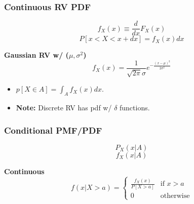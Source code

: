 \subsubsection{Continuous RV PDF}
\begin{definition}
    \begin{equation}
        f_X(x) \equiv \frac{d}{dx} F_X(x)
    \end{equation}
    \begin{equation}
        P[x < X < x+dx] = f_X (x) dx
    \end{equation}
\end{definition}

\begin{example} \textbf{Gaussian RV w/ ($\mu,\sigma^2$)}
    \begin{equation}
        f_X (x) = \frac{1}{\sqrt{2\pi}\sigma} e^{-\frac{(x-\mu)^2}{2\sigma^2}}
    \end{equation}
    \begin{itemize}
        \item $p[X \in A] = \int_{A} f_X(x) dx$.
        \item \textbf{Note:} Discrete RV has pdf w/ $\delta$ functions.
    \end{itemize}
\end{example}

\subsubsection{Conditional PMF/PDF}
\begin{definition}
    \begin{equation}
        P_X (x|A) 
    \end{equation}
    \begin{equation}
        f_X (x|A)
    \end{equation}
\end{definition}

\begin{example} \textbf{Continuous}
    \begin{equation}
        f(x|X>a) = \begin{cases}
            \frac{f_X(x)}{P[X>a]} & \text{if } x > a \\
            0 & \text{otherwise}
        \end{cases}
    \end{equation}
\end{example}

